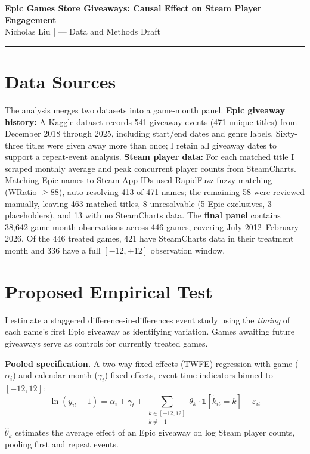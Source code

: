 \documentclass[11pt]{article}
\begin{document}
\begin{center}
  {\large\bfseries Epic Games Store Giveaways: Causal Effect on Steam Player Engagement}\\[0.3em]
  {\small Nicholas Liu \quad| --- Data and Methods Draft}
\end{center}

\vspace{0.3em}
\hrule
\vspace{0.6em}

\section{Data Sources}

The analysis merges two datasets into a game-month panel. \textbf{Epic giveaway history:} A Kaggle dataset \citep{dongre2025} records 541 giveaway events (471 unique titles) from December 2018 through 2025, including start/end dates and genre labels. Sixty-three titles were given away more than once; I retain all giveaway dates to support a repeat-event analysis. \textbf{Steam player data:} For each matched title I scraped monthly average and peak concurrent player counts from SteamCharts. Matching Epic names to Steam App IDs used RapidFuzz fuzzy matching (WRatio $\geq 88$), auto-resolving 413 of 471 names; the remaining 58 were reviewed manually, leaving 463 matched titles, 8 unresolvable (5 Epic exclusives, 3 placeholders), and 13 with no SteamCharts data. The \textbf{final panel} contains 38,642 game-month observations across 446 games, covering July 2012--February 2026. Of the 446 treated games, 421 have SteamCharts data in their treatment month and 336 have a full $[-12,+12]$ observation window.

\section{Proposed Empirical Test}

I estimate a staggered difference-in-differences event study using the \textit{timing} of each game's first Epic giveaway as identifying variation. Games awaiting future giveaways serve as controls for currently treated games.

\textbf{Pooled specification.} A two-way fixed-effects (TWFE) regression with game ($\alpha_i$) and calendar-month ($\gamma_t$) fixed effects, event-time indicators binned to $[-12, 12]$:
\begin{equation}
\ln(y_{it}+1) = \alpha_i + \gamma_t + \sum_{\substack{k\in[-12,12]\\k\neq-1}} \theta_k\cdot\mathbf{1}[\tilde{k}_{it}=k] + \varepsilon_{it}
\end{equation}
$\hat{\theta}_k$ estimates the average effect of an Epic giveaway on log Steam player counts, pooling first and repeat events.
\end{document}
